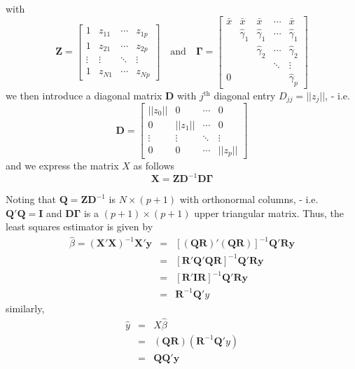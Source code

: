 \documentclass{beamer}
\newcommand{\X}{\bm{X}}
\begin{document}
\begin{frame}
with 
\[
\bm{Z}=
\begin{bmatrix}
1 & z_{11} & \cdots & z_{1p}\\
1& z_{21} &\cdots&z_{2p}\\
\vdots&\vdots&\ddots&\vdots\\
1& z_{N1}&\cdots &z_{Np}
\end{bmatrix}\quad\text{and}\quad
\bm{\Gamma}=
\begin{bmatrix}
\bar{x}&\bar{x}&\bar{x}&\cdots&\bar{x}\\
&\hat{\gamma}_{1}&\hat{\gamma}_{1}&\cdots&\hat{\gamma}_1\\
&&\hat{\gamma}_{2}&\cdots& \hat{\gamma}_2\\
&&&\ddots&\vdots\\
0&&&&\hat{\gamma}_p
\end{bmatrix}
\]
we then introduce a diagonal matrix $\bm{D}$ with $j^{\text{th}}$ diagonal entry $D_{jj}=\lvert\lvert z_j\rvert\rvert$, - i.e. 
\[
\bm{D}=
\begin{bmatrix}
\lvert\lvert z_0\rvert\rvert&0&\cdots&0\\
0&\lvert\lvert z_1\rvert\rvert&\cdots&0\\
\vdots&\vdots&\ddots&\vdots\\
0&0&\cdots&\lvert\lvert z_p\rvert\rvert
\end{bmatrix}
\]
and we express the matrix $X$ as follows
\[
\X=\bm{Z}\bm{D}^{-1}\bm{D}\bm{\Gamma}
\]
\end{frame}
\begin{frame}
Noting that $\bm{Q}=\bm{Z}\bm{D}^{-1}$ is $N\times (p+1)$ with orthonormal columns, - i.e. $\bm{Q}'\bm{Q}=\bm{I}$ and $\bm{D\Gamma}$ is a $(p+1)\times(p+1)$ upper triangular matrix. 
Thus, the least squares estimator is given by
\begin{eqnarray*}
\hat{\beta}=(\X'\X)^{-1}\X'\bm{y}&=&[(\bm{Q}\bm{R})'(\bm{Q}\bm{R})]^{-1}\bm{Q}'\bm{R}\bm{y}\\
&=&[\bm{R}'\bm{Q}'\bm{Q}\bm{R}]^{-1}\bm{Q}'\bm{R}\bm{y}\\
&=&[\bm{R}'\bm{I}\bm{R}]^{-1}\bm{Q}'\bm{R}\bm{y}\\
&=&\bm{R}^{-1}\bm{Q}'y
\end{eqnarray*}
similarly,
\begin{eqnarray*}
\hat{y}&=&X\hat{\beta}\\
&=&(\bm{QR})(\bm{R}^{-1}\bm{Q}'y)\\
&=&\bm{Q}\bm{Q}'\bm{y}
\end{eqnarray*}
\end{frame}
\end{document}

